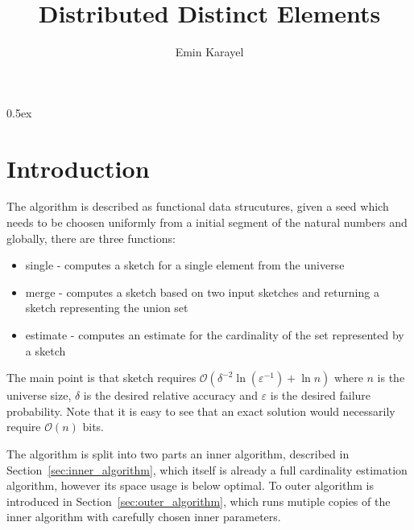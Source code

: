 \documentclass[11pt,a4paper]{article}
\begin{document}
\title{Distributed Distinct Elements}
\author{Emin Karayel}
\maketitle


\tableofcontents

\parindent 0pt\parskip 0.5ex
\pagebreak

\section{Introduction\label{sec:intro}}
The algorithm is described as functional data strucutures, given a seed which needs to be 
choosen uniformly from a initial segment of the natural numbers and globally, there are three 
functions:
\begin{itemize}
\item \textrm{single} - computes a sketch for a single element from the universe
\item \textrm{merge} - computes a sketch based on two input sketches and returning a sketch
representing the union set
\item \textrm{estimate} - computes an estimate for the cardinality of the set represented by a
sketch
\end{itemize}

The main point is that sketch requires $\mathcal O( \delta^{-2} \ln (\varepsilon^{-1}) + \ln n)$
where $n$ is the universe size, $\delta$ is the desired relative accuracy and $\varepsilon$ is the
desired failure probability. Note that it is easy to see that an exact solution would necessarily 
require $\mathcal O(n)$ bits.

The algorithm is split into two parts an inner algorithm, described in 
Section~\ref{sec:inner_algorithm}, which itself is already a full cardinality estimation algorithm,
however its space usage is below optimal. To outer algorithm is introduced in 
Section~\ref{sec:outer_algorithm}, which runs mutiple copies of the inner algorithm with carefully
chosen inner parameters. 
\end{document}
